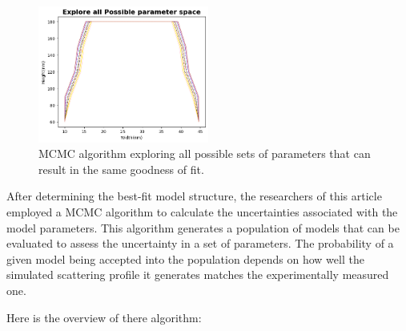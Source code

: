 \begin{figure}[h]
    \centering
    \includegraphics[width=0.5\textwidth]{images/mcmc.png}
    \caption{MCMC algorithm exploring all possible sets of parameters that can result in the same goodness of fit.}
\end{figure}
\medskip

After determining the best-fit model structure, the researchers of this article \cite{sunday2016evaluation}
employed a MCMC algorithm to calculate the uncertainties associated with the model parameters.
This algorithm generates a population of models that can be evaluated to assess the uncertainty
in a set of parameters. The probability of a given model being accepted into the population
depends on how well the simulated scattering profile it generates matches the experimentally
measured one.

Here is the overview of there algorithm:

